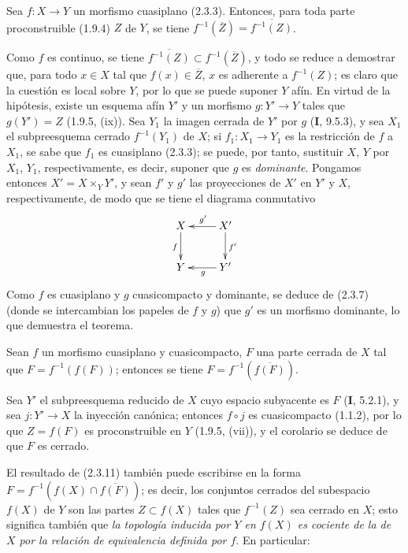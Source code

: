 \begin{theorem}[2.3.10]
\label{IV.2.3.10-fr}
Sea $f:X\to Y$ un morfismo cuasiplano \textup{(2.3.3)}. Entonces, para toda parte
proconstruible \textup{(1.9.4)} $Z$ de $Y$, se tiene
$f^{-1}(\overline Z)=\overline{f^{-1}(Z)}$.
\end{theorem}

Como $f$ es continuo, se tiene
$\overline{f^{-1}(Z)}\subset f^{-1}(\overline Z)$, y todo se reduce a
demostrar que, para todo $x\in X$ tal que $f(x)\in\overline Z$, $x$ es
adherente a $f^{-1}(Z)$; es claro que la cuestión es local sobre $Y$, por lo
que se puede suponer $Y$ afín. En virtud de la hipótesis, existe un esquema afín
$Y'$ y un morfismo $g:Y'\to Y$ tales que $g(Y')=Z$ (1.9.5, (ix)). Sea $Y_1$
la imagen cerrada de $Y'$ por $g$ (\textbf I, 9.5.3), y sea $X_1$ el subpreesquema
cerrado $f^{-1}(Y_1)$ de $X$; si $f_1:X_1\to Y_1$ es la restricción de $f$ a
$X_1$, se sabe que $f_1$ es cuasiplano (2.3.3); se puede, por tanto, sustituir
$X$, $Y$ por $X_1$, $Y_1$, respectivamente, es decir, suponer que $g$ es
\emph{dominante}. Pongamos entonces $X'=X\times_Y Y'$, y sean $f'$ y $g'$ las
proyecciones de $X'$ en $Y'$ y $X$, respectivamente, de modo que se tiene el
diagrama conmutativo
\[
\xymatrix{
  X \ar[d]_f & X' \ar[l]_{g'} \ar[d]^{f'} \\
  Y & Y' \ar[l]^g
}
\]
Como $f$ es cuasiplano y $g$ cuasicompacto y dominante, se deduce de (2.3.7)
(donde se intercambian los papeles de $f$ y $g$) que $g'$ es un morfismo
dominante, lo que demuestra el teorema.

\begin{corollary}[2.3.11]
\label{IV.2.3.11-fr}
Sean $f$ un morfismo cuasiplano y cuasicompacto, $F$ una parte cerrada de
$X$ tal que $F=f^{-1}(f(F))$; entonces se tiene
$F=f^{-1}(\overline{f(F)})$.
\end{corollary}

Sea $Y'$ el subpreesquema reducido de $X$ cuyo espacio subyacente es $F$
(\textbf I, 5.2.1), y sea $j:Y'\to X$ la inyección canónica; entonces $f\circ j$ es
cuasicompacto (1.1.2),
por lo que $Z=f(F)$ es proconstruible en $Y$ (1.9.5, (vii)), y el corolario
se deduce de que $F$ es cerrado.

El resultado de (2.3.11) también puede escribirse en la forma
$F=f^{-1}(f(X)\cap\overline{f(F)})$; es decir, los conjuntos cerrados del
subespacio $f(X)$ de $Y$ son las partes $Z\subset f(X)$ tales que
$f^{-1}(Z)$ sea cerrado en $X$; esto significa también que \emph{la topología
inducida por $Y$ en $f(X)$ es cociente de la de $X$ por la relación de
equivalencia definida por $f$}. En particular:

